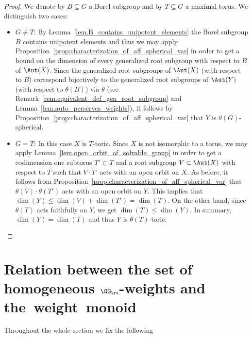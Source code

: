 \begin{proof}
We denote by $B \subseteq G$
a Borel subgroup and by $T \subseteq G$ a maximal torus. We distinguish two cases:

\begin{itemize}
\item
$G \neq T$: By Lemma~\ref{lem.B_contains_unipotent_elements} the Borel subgroup $B$
contains unipotent elements and thus we may apply
Proposition~\ref{prop:characterization_of_aff_spherical_var} in order to get
a bound on the dimension of every generalized root subgroup with respect to $B$ of $\Aut(X)$.
Since the generalized root subgroups of $\Aut(X)$ (with respect to $B$)
correspond bijectively to the generalized root subgroups of $\Aut(Y)$
(with respect to $\theta(B)$) via $\theta$ (see Remark~\ref{rem.equivalent_def_gen_root_subgroup}
and Lemma~\ref{lem.auto_perserves_weights}), it follows by
Proposition~\ref{prop:characterization_of_aff_spherical_var} that
$Y$ is $\theta(G)$-spherical.

\item
$G = T$: In this case $X$ is $T$-toric. Since $X$ is not isomorphic to a torus, we may apply
Lemma~\ref{lem.open_orbit_of_solvable_group} in order to get a codimension one subtorus
$T' \subset T$ and a root subgroup $V \subset \Aut(X)$ with respect
to $T$ such that $V \cdot T'$ acts with an open orbit on $X$.
As before, it follows from Proposition~\ref{prop:characterization_of_aff_spherical_var} that
$\theta(V) \cdot \theta(T')$ acts with an open orbit on $Y$. This implies that
$\dim(Y) \leq \dim(V) + \dim(T') = \dim(T)$. On the other hand, since
$\theta(T)$ acts faithfully on $Y$, we get $\dim(T) \leq \dim(Y)$. In summary,
$\dim(Y) = \dim(T)$ and thus $Y$ is $\theta(T)$-toric.\qedhere
\end{itemize}
\end{proof}

\section{Relation between the set of homogeneous \texorpdfstring{$\GG_\ra$}{Ga}-weights and the~weight~monoid}
\label{sec.relation_homogen_Ga-weights_weight_monoid}

Throughout the whole section we fix the following

